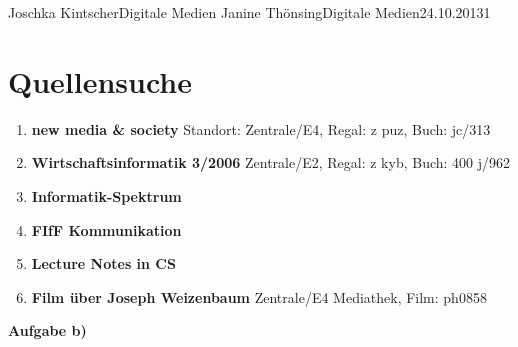 \documentclass{wa}
\begin{document}
	{Joschka Kintscher}{Digitale Medien}
	{Janine Thönsing}{Digitale Medien}{24.10.2013}{1}


\section{Quellensuche}

\begin{enumerate}
  \item\textbf{new media \& society}
  \newline
  Standort: Zentrale/E4, Regal: z puz, Buch: jc/313
  \newline
  \cite{vergeer2013}

  \item\textbf{Wirtschaftsinformatik 3/2006}
  \newline
  Zentrale/E2, Regal: z kyb, Buch: 400 j/962
  \newline
  \cite{thiesse2006}

  \item\textbf{Informatik-Spektrum}
  \newline
  \cite{lintu2009}

  \item\textbf{FIfF Kommunikation}
  \newline
  \cite{bockerman2013}

  \item\textbf{Lecture Notes in CS}
  \newline
  \cite{temdee2006}
 
  \item\textbf{Film über Joseph Weizenbaum}
  \newline
  Zentrale/E4 Mediathek, Film: ph0858
  \newline
  \cite{haas2006}
  \newline
\end{enumerate}

\begin{LARGE}
  \textbf{Aufgabe b)}
\end{LARGE}



\end{document}
